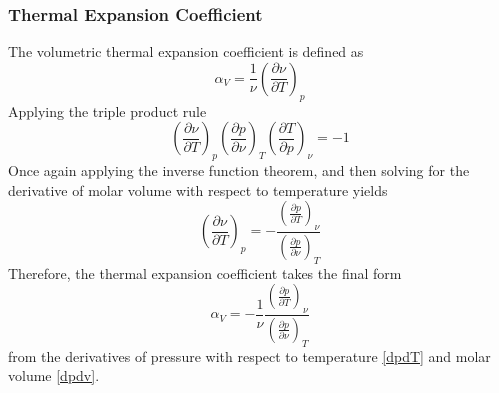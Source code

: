 \documentclass{article}
\newcommand{\pderiv}[2]{\frac{\partial #1}{\partial #2}}
\newcommand{\pderivconst}[3]{\left(\pderiv{#1}{#2}\right)_{#3}}
\begin{document}
\subsubsection{Thermal Expansion Coefficient}
The volumetric thermal expansion coefficient is defined as
\begin{equation}
    \alpha_V = \frac{1}{\nu} \pderivconst{\nu}{T}{p}
\end{equation}
Applying the triple product rule
\begin{equation*}
    \pderivconst{\nu}{T}{p} \pderivconst{p}{\nu}{T} \pderivconst{T}{p}{\nu} = -1 
\end{equation*}
Once again applying the inverse function theorem, and then solving for the derivative of molar volume with respect to temperature yields
\begin{equation*}
    \pderivconst{\nu}{T}{p} = -\frac{\pderivconst{p}{T}{\nu}}{\pderivconst{p}{\nu}{T}}
\end{equation*}
Therefore, the thermal expansion coefficient takes the final form
\begin{equation}
    \alpha_V = -\frac{1}{\nu} \frac{\pderivconst{p}{T}{\nu}}{\pderivconst{p}{\nu}{T}} \label{alphaV}
\end{equation}
from the derivatives of pressure with respect to temperature \eqref{dpdT} and molar volume \eqref{dpdv}. 
\end{document}
